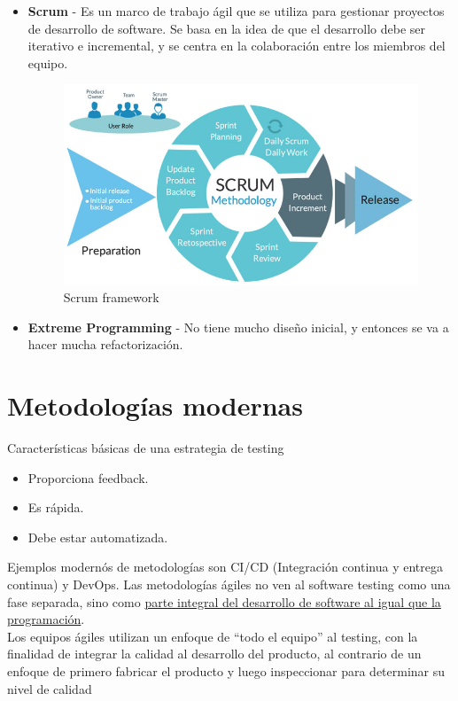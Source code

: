 \begin{itemize}
   \newpage
   \begin{itemize}
      \item \textbf{Scrum} - Es un marco de trabajo ágil que se utiliza para gestionar proyectos de desarrollo de software. Se basa en la idea de que el desarrollo debe ser iterativo e incremental, y se centra en la colaboración entre los miembros del equipo.
      \begin{figure}[htbp]
         \centering
         \includegraphics{images/07/scrum.jpg}
         \caption{Scrum framework}
         \label{fig:scrum}
      \end{figure}
      \item \textbf{Extreme Programming} - No tiene mucho diseño inicial, y entonces se va a hacer mucha refactorización.
   \end{itemize}
\end{itemize}


\section{Metodologías modernas}

{Características básicas de una estrategia de testing\ns
\begin{itemize}
	\item Proporciona feedback.
	\item Es rápida.
	\item Debe estar automatizada.
\end{itemize}}
Ejemplos modernós de metodologías son CI/CD (Integración continua y entrega continua) y DevOps.
Las metodologías ágiles no ven al software testing como una fase separada, sino como \ul{parte integral del desarrollo de software al igual que la programación}.\\
Los equipos ágiles utilizan un enfoque de ``todo el equipo'' al testing, con la finalidad de integrar la calidad al desarrollo del producto, al contrario de un enfoque de primero fabricar el producto y luego inspeccionar para determinar su nivel de calidad

